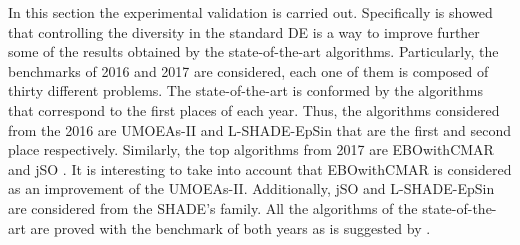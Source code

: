 In this section the experimental validation is carried out.
%
Specifically is showed that controlling the diversity in the standard DE is a way to improve further some of the results obtained by the state-of-the-art algorithms.
%
Particularly, the benchmarks of \CEC{} 2016 and \CEC{} 2017 are considered, each one of them is composed of thirty different problems.
%
The state-of-the-art is conformed by the algorithms that correspond to the first places of each year.
%
Thus, the algorithms considered from the \CEC{} 2016 are UMOEAs-II \cite{elsayed2016testing} and L-SHADE-EpSin \cite{awad2016ensemble} that are the first and second place respectively.
%
Similarly, the top algorithms from \CEC{} 2017 are EBOwithCMAR \cite{kumar2017improving} and jSO \cite{brest2017single}.
%
It is interesting to take into account that EBOwithCMAR is considered as an improvement of the UMOEAs-II.
%
Additionally, jSO and L-SHADE-EpSin are considered from the SHADE's family.
%
All the algorithms of the state-of-the-art are proved with the benchmark of both years as is suggested by \cite{molina2017analysis}.


